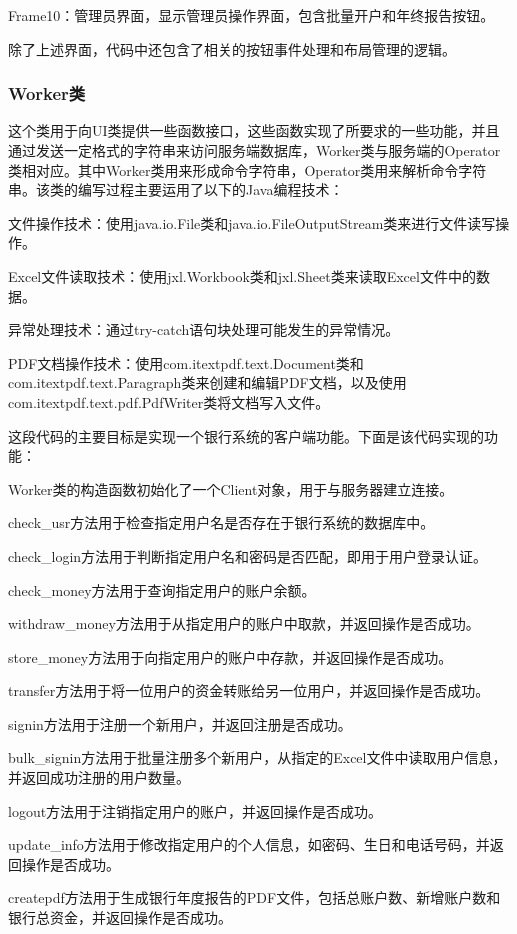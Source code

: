 Frame10：管理员界面，显示管理员操作界面，包含批量开户和年终报告按钮。

除了上述界面，代码中还包含了相关的按钮事件处理和布局管理的逻辑。

\subsubsection{Worker类}
这个类用于向UI类提供一些函数接口，这些函数实现了所要求的一些功能，并且通过发送一定格式的字符串来访问服务端数据库，Worker类与服务端的Operator类相对应。其中Worker类用来形成命令字符串，Operator类用来解析命令字符串。该类的编写过程主要运用了以下的Java编程技术：

文件操作技术：使用java.io.File类和java.io.FileOutputStream类来进行文件读写操作。

Excel文件读取技术：使用jxl.Workbook类和jxl.Sheet类来读取Excel文件中的数据。

异常处理技术：通过try-catch语句块处理可能发生的异常情况。

PDF文档操作技术：使用com.itextpdf.text.Document类和com.itextpdf.text.Paragraph类来创建和编辑PDF文档，以及使用com.itextpdf.text.pdf.PdfWriter类将文档写入文件。

这段代码的主要目标是实现一个银行系统的客户端功能。下面是该代码实现的功能：

Worker类的构造函数初始化了一个Client对象，用于与服务器建立连接。

check\_usr方法用于检查指定用户名是否存在于银行系统的数据库中。

check\_login方法用于判断指定用户名和密码是否匹配，即用于用户登录认证。

check\_money方法用于查询指定用户的账户余额。

withdraw\_money方法用于从指定用户的账户中取款，并返回操作是否成功。

store\_money方法用于向指定用户的账户中存款，并返回操作是否成功。

transfer方法用于将一位用户的资金转账给另一位用户，并返回操作是否成功。

signin方法用于注册一个新用户，并返回注册是否成功。

bulk\_signin方法用于批量注册多个新用户，从指定的Excel文件中读取用户信息，并返回成功注册的用户数量。

logout方法用于注销指定用户的账户，并返回操作是否成功。

update\_info方法用于修改指定用户的个人信息，如密码、生日和电话号码，并返回操作是否成功。

createpdf方法用于生成银行年度报告的PDF文件，包括总账户数、新增账户数和银行总资金，并返回操作是否成功。


